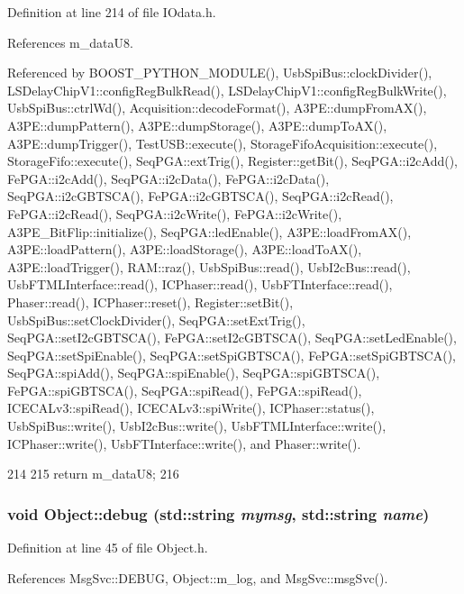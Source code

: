 Definition at line 214 of file IOdata.h.

References m\_\-dataU8.

Referenced by BOOST\_\-PYTHON\_\-MODULE(), UsbSpiBus::clockDivider(), LSDelayChipV1::configRegBulkRead(), LSDelayChipV1::configRegBulkWrite(), UsbSpiBus::ctrlWd(), Acquisition::decodeFormat(), A3PE::dumpFromAX(), A3PE::dumpPattern(), A3PE::dumpStorage(), A3PE::dumpToAX(), A3PE::dumpTrigger(), TestUSB::execute(), StorageFifoAcquisition::execute(), StorageFifo::execute(), SeqPGA::extTrig(), Register::getBit(), SeqPGA::i2cAdd(), FePGA::i2cAdd(), SeqPGA::i2cData(), FePGA::i2cData(), SeqPGA::i2cGBTSCA(), FePGA::i2cGBTSCA(), SeqPGA::i2cRead(), FePGA::i2cRead(), SeqPGA::i2cWrite(), FePGA::i2cWrite(), A3PE\_\-BitFlip::initialize(), SeqPGA::ledEnable(), A3PE::loadFromAX(), A3PE::loadPattern(), A3PE::loadStorage(), A3PE::loadToAX(), A3PE::loadTrigger(), RAM::raz(), UsbSpiBus::read(), UsbI2cBus::read(), UsbFTMLInterface::read(), ICPhaser::read(), UsbFTInterface::read(), Phaser::read(), ICPhaser::reset(), Register::setBit(), UsbSpiBus::setClockDivider(), SeqPGA::setExtTrig(), SeqPGA::setI2cGBTSCA(), FePGA::setI2cGBTSCA(), SeqPGA::setLedEnable(), SeqPGA::setSpiEnable(), SeqPGA::setSpiGBTSCA(), FePGA::setSpiGBTSCA(), SeqPGA::spiAdd(), SeqPGA::spiEnable(), SeqPGA::spiGBTSCA(), FePGA::spiGBTSCA(), SeqPGA::spiRead(), FePGA::spiRead(), ICECALv3::spiRead(), ICECALv3::spiWrite(), ICPhaser::status(), UsbSpiBus::write(), UsbI2cBus::write(), UsbFTMLInterface::write(), ICPhaser::write(), UsbFTInterface::write(), and Phaser::write().


\begin{DoxyCode}
214               {
215     return m_dataU8;
216   }
\end{DoxyCode}
\hypertarget{classObject_a6c9a0397ca804e04d675ed05683f5420}{
\subsubsection[{debug}]{\setlength{\rightskip}{0pt plus 5cm}void Object::debug (std::string {\em mymsg}, \/  std::string {\em name})}}
\label{classObject_a6c9a0397ca804e04d675ed05683f5420}


Definition at line 45 of file Object.h.

References MsgSvc::DEBUG, Object::m\_\-log, and MsgSvc::msgSvc().



